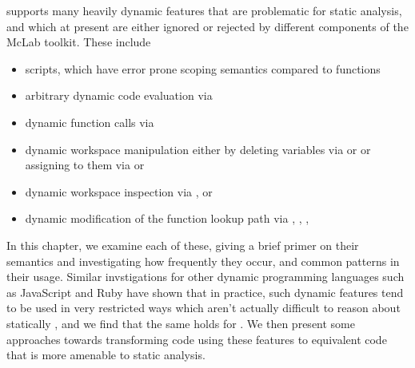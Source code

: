 \matlab supports many heavily dynamic features that are problematic for static
analysis, and which at present are either ignored or rejected by different
components of the McLab toolkit. These include

\begin{itemize}

\item scripts, which have error prone scoping semantics compared to functions

\item arbitrary dynamic code evaluation via 

\item dynamic function calls via 

\item dynamic workspace manipulation either by deleting variables via
 or  or assigning to them via  or

\item dynamic workspace inspection via ,  or 

\item dynamic modification of the function lookup path via ,
, , 

\end{itemize}

In this chapter, we examine each of these, giving a brief primer on their
semantics and investigating how frequently they occur, and common patterns in
their usage. Similar invstigations for other dynamic programming languages such
as JavaScript \cite{TheEvalThatMenDo} and Ruby \cite{ProfileGuidedStaticTyping}
have shown that in practice, such dynamic features tend to be used in very
restricted ways which aren't actually difficult to reason about statically ,
and we find that the same holds for \matlab. We then present some approaches
towards transforming code using these features to equivalent code that is more
amenable to static analysis.

\section{\mcbench}


